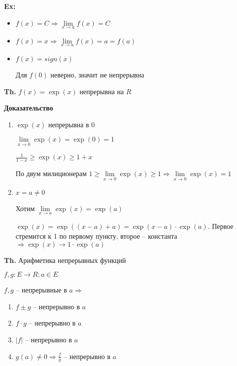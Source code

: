 \documentclass[14pt, letter paper]{article}
\begin{document}
\textbf{Ex:}

\begin{itemize}
    \item $f(x) = C \Rightarrow \lim\limits_{x \rightarrow a}{f(x)} = C$
    \item $f(x) = x \Rightarrow \lim\limits_{x \rightarrow a}{f(x)} = a = f(a)$
    \item $f(x) = sign(x)$

    Для $f(0)$ неверно, значит не непрерывна
\end{itemize}

\textbf{Th.} $f(x) = \exp(x)$ непрерывна на $R$

\begin{center}
    \textbf{Доказательство}
\end{center}

\begin{enumerate}
    \item $\exp(x)$ непрерывна в $0$

    $\lim\limits_{x \rightarrow 0}{\exp(x)} = \exp(0) = 1$

    $\frac{1}{1-x} \geq \exp(x) \geq 1 + x$

    По двум милиционерам $1 \geq \lim\limits_{x \rightarrow 0}{\exp(x)} \geq 1 \Rightarrow \lim\limits_{x \rightarrow 0}{\exp(x)} = 1$

    \item $x = a \neq 0$

    Хотим $\lim\limits_{x \rightarrow a}{\exp(x)} = \exp(a)$

    $\exp(x) = \exp((x - a) + a) = \exp(x - a) \cdot \exp(a)$. Первое стремится к 1 по первому пункту, второе -- константа $\Rightarrow \exp(x) \rightarrow 1 \cdot \exp(a)$
\end{enumerate}

\textbf{Th.} Арифметика непрерывных функций

$f, g : E \rightarrow R; a \in E$

$f, g$ -- непрерывные в $a \Rightarrow$

\begin{enumerate}
    \item $f \pm g$ -- непрерывно в $a$
    \item $f \cdot g$ -- непрерывно в $a$
    \item $|f|$ -- непрерывно в $a$
    \item $g(a) \neq 0 \Rightarrow \frac{f}{g}$ -- непрерывно в $a$
\end{enumerate}
\end{document}
